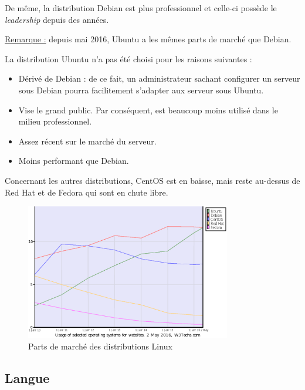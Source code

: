 \newpage

De même, la distribution Debian est plus professionnel et celle-ci possède le
\textit{leadership} depuis des années.

\underline{Remarque :} depuis mai 2016, Ubuntu a les mêmes parts de marché que
Debian.

La distribution Ubuntu n'a pas été choisi pour les raisons suivantes :
\begin{itemize}
\item Dérivé de Debian : de ce fait, un administrateur sachant configurer un
serveur sous Debian pourra facilitement s'adapter aux serveur sous Ubuntu.

\item Vise le grand public. Par conséquent, est beaucoup moins utilisé dans le
milieu professionnel.

\item Assez récent sur le marché du serveur.

\item Moins performant que Debian.
\end{itemize}

Concernant les autres distributions, CentOS est en baisse, mais reste au-dessus
de Red Hat et de Fedora qui sont en chute libre.

\begin{figure}[h]
  \centering
  \includegraphics[width=0.8\textwidth]
  {textures/images/installation/distributions.eps}
  \caption{Parts de marché des distributions Linux}
\end{figure}

\newpage

\subsection{Langue}
\label{subsec:langue}

